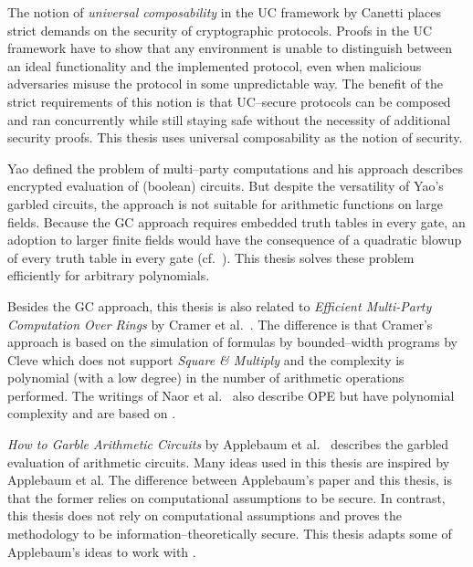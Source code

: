%
%
\label{sec:related-work}

The notion of \emph{universal composability} in the UC framework by Canetti
\cite{canetti01} places strict demands on the security of cryptographic
protocols. Proofs in the UC framework have to show that any environment is
unable to distinguish between an ideal functionality and the implemented
protocol, even when malicious adversaries misuse the protocol in some
unpredictable way. The benefit of the strict requirements of this notion is that
UC--secure protocols can be composed and ran concurrently while still staying
safe without the necessity of additional security proofs. This thesis uses
universal composability as the notion of security.

Yao defined the problem of multi--party computations and his  approach \cite{yao86} describes encrypted evaluation of (boolean)
circuits. But despite the versatility of Yao's garbled circuits, the approach is
not suitable for arithmetic functions on large fields. Because the GC approach
requires embedded truth tables in every gate, an adoption to larger finite
fields would have the consequence of a quadratic blowup of every truth table in
every gate (cf.\ \cite{naor99privacy}). This thesis solves these problem
efficiently for arbitrary polynomials.

Besides the GC approach, this thesis is also related to \emph{Efficient
Multi-Party Computation Over Rings} by Cramer et al.~\cite{cramer03}. The
difference is that Cramer's approach is based on the simulation of formulas by
bounded--width programs by Cleve \cite{cleve91} which does not support
\emph{Square \& Multiply} \cite{knuth81} and the complexity is polynomial (with
a low degree) in the number of arithmetic operations performed. The writings of
Naor et al.~\cite{naor99,naor06} also describe OPE but have polynomial
complexity and are based on  \cite{rabin81}.

\emph{How to Garble Arithmetic Circuits} by Applebaum et al.~\cite{gac2012}
describes the garbled evaluation of arithmetic circuits.  Many ideas used in
this thesis are inspired by Applebaum et al. The difference between
Applebaum's paper and this thesis, is that the former relies on computational
assumptions to be secure. In contrast, this thesis does not rely on
computational assumptions and proves the methodology to be
information--theoretically secure. This thesis adapts some of Applebaum's ideas
to work with 
\cite{davidgoliath}.

